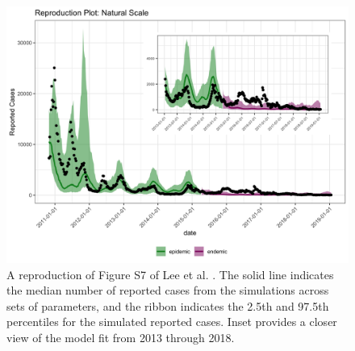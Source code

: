 \documentclass[12pt]{article}
\begin{document}
\begin{figure}[H]
  \centering
  \includegraphics[width=150mm]{reprod_inset.png}
  \caption{A reproduction of Figure S7 of Lee et al. \cite{Lee_supp}. The solid line indicates the median number of reported cases from the simulations across sets of parameters, and the ribbon indicates the 2.5th and 97.5th percentiles for the simulated reported cases. Inset provides a closer view of the model fit from 2013 through 2018.}
\end{figure}
\end{document}
